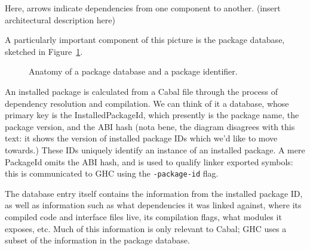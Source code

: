 \documentclass{article}
\begin{document}
Here, arrows indicate dependencies from one component to another.
(insert architectural description here)

A particularly important component of this picture is the package
database, sketched in Figure~\ref{fig:pkgdb}.

\begin{figure}[H]
\label{fig:pkgdb}\caption{Anatomy of a package database and a package identifier.}
\end{figure}

An installed package is calculated from a Cabal file through the process
of dependency resolution and compilation.  We can think of it a
database, whose primary key is the InstalledPackageId, which presently
is the package name, the package version, and the ABI hash (nota bene,
the diagram disagrees with this text: it shows the version of installed
package IDs which we'd like to move towards.)  These IDs uniquely
identify an instance of an installed package.  A mere PackageId omits
the ABI hash, and is used to qualify linker exported symbols: this is
communicated to GHC using the \verb|-package-id| flag.

The database entry itself contains the information from the installed package ID,
as well as information such as what dependencies it was linked against, where
its compiled code and interface files live, its compilation flags, what modules
it exposes, etc.  Much of this information is only relevant to Cabal; GHC
uses a subset of the information in the package database.
\end{document}
